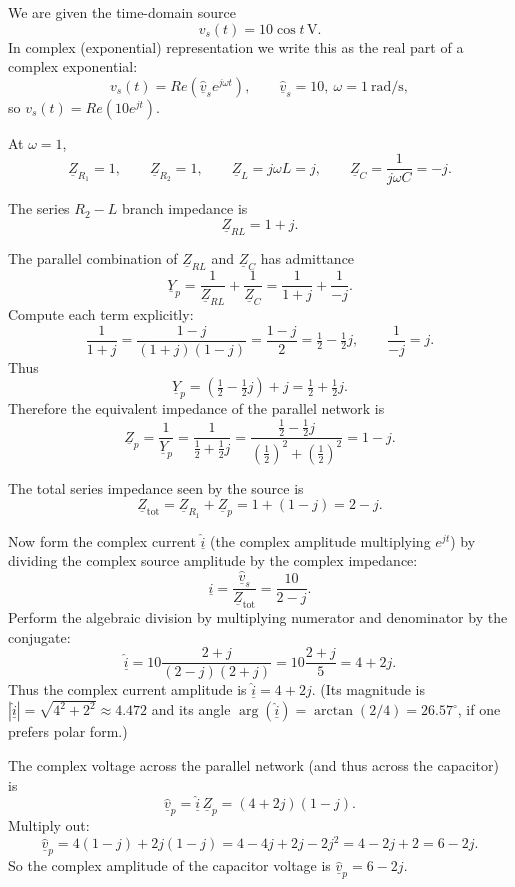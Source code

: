 \documentclass[11pt,a4paper]{article}
\newif\ifshowsolutions
\newenvironment{solution}
  {\ifshowsolutions
     \begin{tcolorbox}[enhanced, breakable, width=\textwidth,
       colback=green!5!white,colframe=green!50!black,
       fonttitle=\bfseries\large,
       title=Solution]}
  {\end{tcolorbox}\fi}
\begin{document}
\ifshowsolutions
\begin{solution}
We are given the time-domain source
\[
v_s(t) = 10\cos t\,\text{V}.
\]
In complex (exponential) representation we write this as the real part of a complex exponential:
\[
v_s(t) = Re(\underline{\hat{v}}_s e^{j\omega t}),\qquad \underline{\hat{v}}_s = 10,\ \omega=1\ \text{rad/s},
\]
so \(v_s(t)=Re(10 e^{j t})\).

At \(\omega=1\),
\[
\underline{Z}_{R_1} = 1,\qquad \underline{Z}_{R_2} = 1,\qquad \underline{Z}_L = j\omega L = j,\qquad \underline{Z}_C = \frac{1}{j\omega C} = -j.
\]

The series \(R_2\!-\!L\) branch impedance is
\[
\underline{Z}_{RL}=1+j.
\]

The parallel combination of \(\underline{Z}_{RL}\) and \(\underline{Z}_C\) has admittance
\[
\underline{Y}_{p} = \frac{1}{\underline{Z}_{RL}} + \frac{1}{\underline{Z}_C} = \frac{1}{1+j} + \frac{1}{-j}.
\]
Compute each term explicitly:
\[
\frac{1}{1+j} = \frac{1-j}{(1+j)(1-j)} = \frac{1-j}{2} = \tfrac12 - \tfrac12 j,
\qquad
\frac{1}{-j} = j.
\]
Thus
\[
\underline{Y}_p = \left(\tfrac12 - \tfrac12 j\right) + j = \tfrac12 + \tfrac12 j.
\]
Therefore the equivalent impedance of the parallel network is
\[
\underline{Z}_p = \frac{1}{\underline{Y}_p} = \frac{1}{\tfrac12 + \tfrac12 j} = \frac{\tfrac12 - \tfrac12 j}{(\tfrac12)^2 + (\tfrac12)^2} = 1-j.
\]

The total series impedance seen by the source is
\[
\underline{Z}_{\text{tot}} = \underline{Z}_{R_1} + \underline{Z}_p = 1+(1-j) = 2-j.
\]

Now form the complex current \(\underline{\hat{i}}\) (the complex amplitude multiplying \(e^{j t}\)) by dividing the complex source amplitude by the complex impedance:
\[
\underline{\hat{i}} = \frac{\underline{\hat{v}}_s}{\underline{Z}_{\text{tot}}} = \frac{10}{2-j}.
\]
Perform the algebraic division by multiplying numerator and denominator by the conjugate:
\[
\underline{\hat{i}} = 10\frac{2+j}{(2-j)(2+j)} = 10\frac{2+j}{5} = 4+2j.
\]
Thus the complex current amplitude is \(\underline{\hat{i}} = 4+2j\). (Its magnitude is \(|\underline{\hat{i}}| = \sqrt{4^2+2^2} \approx 4.472\) and its angle \(\arg(\underline{\hat{i}}) = \arctan(2/4) = 26.57^\circ\), if one prefers polar form.)

The complex voltage across the parallel network (and thus across the capacitor) is
\[
\underline{\hat{v}}_p = \underline{\hat{i}}\,\underline{Z}_p = (4+2j)(1-j).
\]
Multiply out:
\[
\underline{\hat{v}}_p = 4(1-j)+2j(1-j) = 4-4j+2j-2j^2 = 4-2j+2 = 6-2j.
\]
So the complex amplitude of the capacitor voltage is \(\underline{\hat{v}}_p = 6-2j\).


\end{solution}
\end{document}
